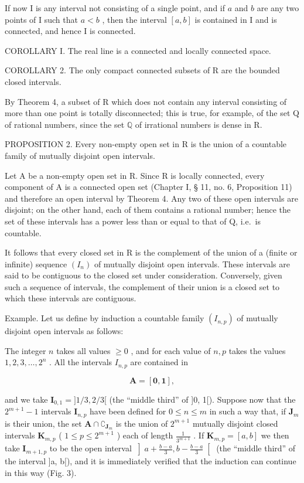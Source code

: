 If now I is any interval not consisting of a single point, and if \(a\) and \(b\) are any two points of I such that \(a < b\) , then the interval \([a, b]\) is contained in I and is connected, and hence I is connected.

COROLLARY I. The real line is a connected and locally connected space.

COROLLARY 2. The only compact connected subsets of R are the bounded closed intervals.

By Theorem 4, a subset of R which does not contain any interval consisting of more than one point is totally disconnected; this is true, for example, of the set Q of rational numbers, since the set \(\mathbb{Q}\) of irrational numbers is dense in R.

PROPOSITION 2. Every non-empty open set in R is the union of a countable family of mutually disjoint open intervals.

Let A be a non-empty open set in R. Since R is locally connected, every component of A is a connected open set (Chapter I, § 11, no. 6, Proposition 11) and therefore an open interval by Theorem 4. Any two of these open intervals are disjoint; on the other hand, each of them contains a rational number; hence the set of these intervals has a power less than or equal to that of Q, i.e.~is countable.

It follows that every closed set in R is the complement of the union of a (finite or infinite) sequence \((I_{n})\) of mutually disjoint open intervals. These intervals are said to be contiguous to the closed set under consideration. Conversely, given such a sequence of intervals, the complement of their union is a closed set to which these intervals are contiguous.

Example. Let us define by induction a countable family \((I_{n,p})\) of mutually disjoint open intervals as follows:

The integer \(n\) takes all values \(\geqslant 0\) , and for each value of \(n, p\) takes the values \(1, 2, 3, \ldots, 2^n\) . All the intervals \(I_{n,p}\) are contained in

\[
\mathbf {A} = [ \mathbf {0}, \mathbf {1} ],
\]

and we take \(\mathbf{I}_{0,1} = ]1/3, 2/3[\) (the ``middle third'' of {]}0, 1{[}). Suppose now that the \(2^{m+1} - 1\) intervals \(\mathbf{I}_{n,p}\) have been defined for \(0 \leqslant n \leqslant m\) in such a way that, if \(\mathbf{J}_m\) is their union, the set \(\mathbf{A} \cap \complement_{\mathbf{J}_m}\) is the union of \(2^{m+1}\) mutually disjoint closed intervals \(\mathbf{K}_{m,p}\) ( \(1 \leqslant p \leqslant 2^{m+1}\) ) each of length \(\frac{1}{3^{m+1}}\) . If \(\mathbf{K}_{m,p} = [a, b]\) we then take \(\mathbf{I}_{m+1,p}\) to be the open interval \(\left]a + \frac{b - a}{3}, b - \frac{b - a}{3}\right[\) (the ``middle third'' of the interval {]}a, b{[}), and it is immediately verified that the induction can continue in this way (Fig. 3).

